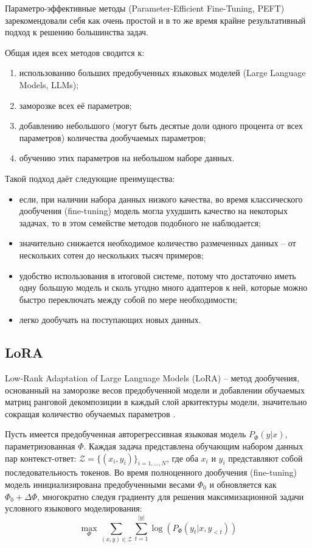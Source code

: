 Параметро-эффективные методы (Parameter-Efficient Fine-Tuning, PEFT) зарекомендовали себя как очень простой и в то же время крайне результативный подход к решению большинства задач.

Общая идея всех методов сводится к:
\begin{enumerate}
    \item использованию больших предобученных языковых моделей (Large Language Models, LLMs);
    \item заморозке всех её параметров;
    \item добавлению небольшого (могут быть десятые доли одного процента от всех параметров) количества дообучаемых параметров;
    \item обучению этих параметров на небольшом наборе данных.
\end{enumerate}

Такой подход даёт следующие преимущества:
\begin{itemize}
    \item если, при наличии набора данных низкого качества, во время классического дообучения (fine-tuning) модель могла ухудшить качество на некоторых задачах, то в этом семействе методов подобного не наблюдается;
    \item значительно снижается необходимое количество размеченных данных – от нескольких сотен до нескольких тысяч примеров;
    \item удобство использования в итоговой системе, потому что достаточно иметь одну большую модель и сколь угодно много адаптеров к ней, которые можно быстро переключать между собой по мере необходимости;
    \item легко дообучать на поступающих новых данных.
\end{itemize}

\subsection{LoRA}
Low-Rank Adaptation of Large Language Models (LoRA) -- метод дообучения, основанный на заморозке весов предобученной модели и добавлении обучаемых матриц ранговой декомпозиции в каждый слой аркитектуры модели, значительно сокращая количество обучаемых параметров \cite{lora}.

Пусть имеется предобученная авторегрессивная языковая модель $P_\Phi(y|x)$, параметризованная $\Phi$.
Каждая задача представлена обучающим набором данных пар контекст-ответ: $\mathcal{Z} = \{(x_i, y_i)\}_{i=1,...,N}$, где оба $x_i$ и $y_i$ представляют собой последовательность токенов.
Во время полноценного дообучения (fine-tuning) модель инициализирована предобученными весами $\Phi_0$ и обновляется как $\Phi_0 + \Delta \Phi$, многократно следуя градиенту для решения максимизационной задачи условного языкового моделирования:
$$
\max_{\Phi}
\sum_{(x,y)\in \mathcal{Z}}
\sum_{t=1}^{|y|}
\log(P_\Phi(y_t|x,y_{<t}))
$$

